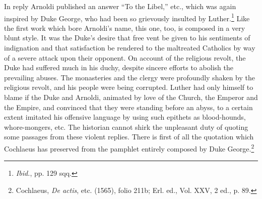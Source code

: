 In reply Arnoldi published an answer “To the Libel,” etc., which
was again inspired by Duke George, who had been so grievously insulted
by Luther.\footnote{\textit{Ibid.}, pp. 129 sqq.}
 Like the first work which bore Arnoldi’s name,
this one, too, is composed in a very blunt style. It was the Duke’s desire
that free vent be given to his sentiments of indignation and that
satisfaction be rendered to the maltreated Catholics by way of a severe
attack upon their opponent. On account of the religious revolt, the
Duke had suffered much in his duchy, despite sincere efforts to abolish
the prevailing abuses. The monasteries and the clergy were profoundly
shaken by the religious revolt, and his people were being corrupted.
Luther had only himself to blame if the Duke and Arnoldi, animated
by love of the Church, the Emperor and the Empire, and convinced
that they were standing before an abyss, to a certain extent imitated
his offensive language by using such epithets as blood-hounds, whore-mongers,
etc. The historian cannot shirk the unpleasant duty of quoting
some passages from these violent replies. There is first of all the
quotation which Cochlaeus has preserved from the pamphlet entirely
composed by Duke George.\footnote
{Cochlaeus, \textit{De actis}, etc. (1565), folio 211b; Erl. ed., Vol. XXV, 2 ed., p. 89.}
